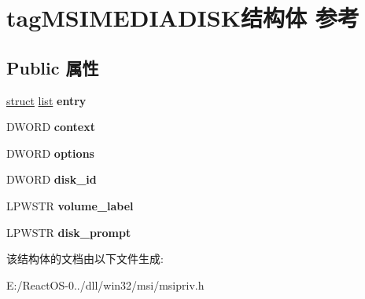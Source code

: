 \hypertarget{structtag_m_s_i_m_e_d_i_a_d_i_s_k}{}\section{tag\+M\+S\+I\+M\+E\+D\+I\+A\+D\+I\+S\+K结构体 参考}
\label{structtag_m_s_i_m_e_d_i_a_d_i_s_k}
\subsection*{Public 属性}
\begin{DoxyCompactItemize}
\item 
\mbox{\label{structtag_m_s_i_m_e_d_i_a_d_i_s_k_a8ccb01137cb1a3648f31f4ef3b663a56}} 
\hyperlink{interfacestruct}{struct} \hyperlink{classlist}{list} {\bfseries entry}
\item 
\mbox{\label{structtag_m_s_i_m_e_d_i_a_d_i_s_k_a1927d7433c1cd693260c261506bae190}} 
D\+W\+O\+RD {\bfseries context}
\item 
\mbox{\label{structtag_m_s_i_m_e_d_i_a_d_i_s_k_a2f6e81f26e5510cff7bca7b45554cf29}} 
D\+W\+O\+RD {\bfseries options}
\item 
\mbox{\label{structtag_m_s_i_m_e_d_i_a_d_i_s_k_abb462454780e4558be5aa67b8d01aefa}} 
D\+W\+O\+RD {\bfseries disk\+\_\+id}
\item 
\mbox{\label{structtag_m_s_i_m_e_d_i_a_d_i_s_k_a78c13f747e84dc866178dbc6ebf4f973}} 
L\+P\+W\+S\+TR {\bfseries volume\+\_\+label}
\item 
\mbox{\label{structtag_m_s_i_m_e_d_i_a_d_i_s_k_abadba9680ef27dad1eaa641bdfaff1aa}} 
L\+P\+W\+S\+TR {\bfseries disk\+\_\+prompt}
\end{DoxyCompactItemize}


该结构体的文档由以下文件生成\+:\begin{DoxyCompactItemize}
\item 
E\+:/\+React\+O\+S-\/0../dll/win32/msi/msipriv.\+h\end{DoxyCompactItemize}
